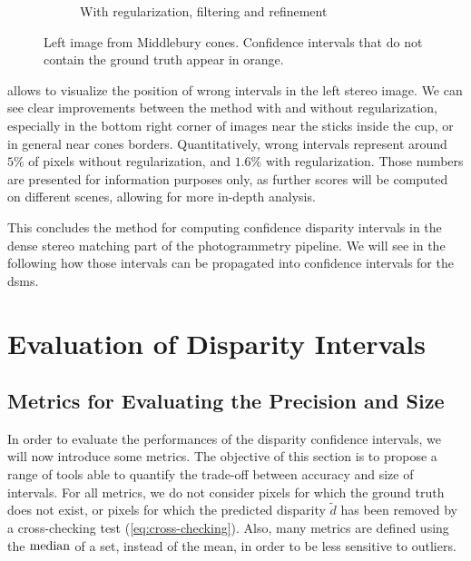 \begin{figure}
\begin{subfigure}[t]{0.49\linewidth}
        \caption{With regularization, filtering and refinement}
        \label{fig:comparison_wrong_intervals_reg}
    \end{subfigure}
    \caption{Left image from Middlebury cones. Confidence intervals that do not contain the ground truth appear in orange.}
    \label{fig:comparison_wrong_intervals}
\end{figure}

 allows to visualize the position of wrong intervals in the left stereo image. We can see clear improvements between the method with and without regularization, especially in the bottom right corner of images near the sticks inside the cup, or in general near cones borders. Quantitatively, wrong intervals represent around $5\%$ of pixels without regularization, and $1.6\%$ with regularization. Those numbers are presented for information purposes only, as further scores will be computed on different scenes, allowing for more in-depth analysis.

This concludes the method for computing confidence disparity intervals in the dense stereo matching part of the photogrammetry pipeline. We will see in the following how those intervals can be propagated into confidence intervals for the \acrshort{dsm}s.


\section{Evaluation of Disparity Intervals}
\subsection{Metrics for Evaluating the Precision and Size}\label{sec:metrics_disparity}
In order to evaluate the performances of the disparity confidence intervals, we will now introduce some metrics. The objective of this section is to propose a range of tools able to quantify the trade-off between accuracy and size of intervals. For all metrics, we do not consider pixels for which the ground truth does not exist, or pixels for which the predicted disparity $\tilde{d}$ has been removed by a cross-checking test (\cref{eq:cross-checking}). Also, many metrics are defined using the $\operatorname*{median}$ of a set, instead of the mean, in order to be less sensitive to outliers. 


